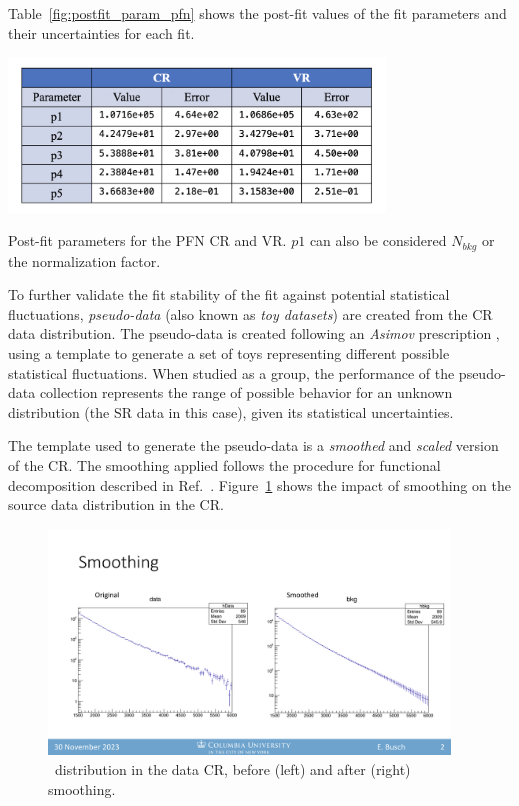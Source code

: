 Table~\ref{fig:postfit_param_pfn} shows the post-fit values of the fit parameters and their uncertainties for each fit. 
\begin{table}[!htbp]
\centering
   \includegraphics[width=0.75\textwidth]{figures/stats/postfit_param_pfn}
    \caption{Post-fit parameters for the PFN CR and VR. $p1$ can also be considered $N_{bkg}$ or the normalization factor.
    \label{fig:postfit_param_pfn}}
\end{table}

To further validate the fit stability of the fit against potential statistical fluctuations, \textit{pseudo-data} (also known as \textit{toy datasets}) are created from the CR data distribution. 
The pseudo-data is created following an \textit{Asimov} prescription \cite{asimov}, using a template to generate a set of toys representing different possible statistical fluctuations.
When studied as a group, the performance of the pseudo-data collection represents the range of possible behavior for an unknown distribution (the SR data in this case), given its statistical uncertainties.

The template used to generate the pseudo-data is a \textit{smoothed} and \textit{scaled} version of the CR. 
The smoothing applied follows the procedure for functional decomposition described in Ref.~\cite{edgar2018functional}.
Figure~\ref{fig:smoothing} shows the impact of smoothing on the source data distribution in the CR.
\begin{figure}[!htbp]
\centering
   \includegraphics[width=0.95\textwidth]{figures/stats/smoothing}
    \caption{\mt~distribution in the data CR, before (left) and after (right) smoothing.
    \label{fig:smoothing}}
\end{figure}

